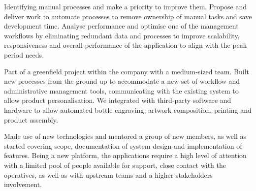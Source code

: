 \cventrycont
    {\begin{cvitems}
        \item{Identifying manual processes and make a priority to improve them. Propose and deliver work to automate processes to remove ownership of 
        manual tasks and save development time. Analyse performance and optimise one of the management workflows by eliminating redundant data and 
        processes to improve scalability, responsiveness and overall performance of the application to align with the peak period needs.}
        \item{Part of a greenfield project within the company with a medium-sized team. Built new processes from the ground up to accommodate a new 
        set of workflow and administrative management tools, communicating with the existing system to allow product personalisation. We integrated 
        with third-party software and hardware to allow automated bottle engraving, artwork composition, printing and product assembly.}
        \item{Made use of new technologies and mentored a group of new members, as well as started covering scope, documentation of system design 
        and implementation of features. Being a new platform, the applications require a high level of attention with a limited pool of people 
        available for support, close contact with the operatives, as well as with upstream teams and a higher stakeholders involvement.}
    \end{cvitems}}
